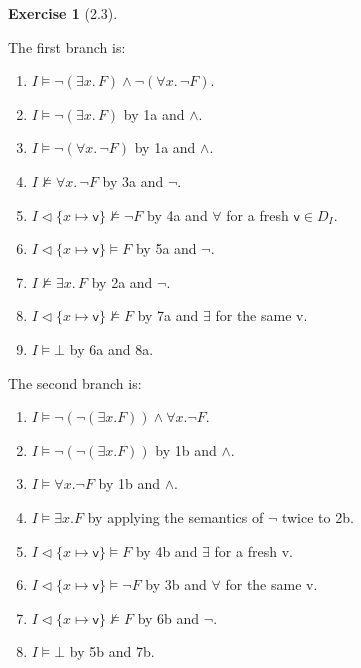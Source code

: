 \documentclass[12pt, psamsfonts]{amsart}
\theoremstyle{definition}
\newtheorem*{exer}{Exercise}
\theoremstyle{remark}
\numberwithin{equation}{subsection}
\begin{document}
\begin{exer}[2.3]
\begin{enumerate}[label=(\alph*)]
            The first branch is:
            \begin{enumerate}[label=\arabic*a.]
                \item %
                    $I \models \neg(\exists x.\, F) \land \neg(\forall x.\, \neg F)$.
                \item %
                    $I \models \neg(\exists x.\, F)$ by 1a and $\land$.
                \item %
                    $I \models \neg(\forall x.\, \neg F)$ by 1a and $\land$.
                \item %
                    $I \not\models \forall x.\, \neg F$ by 3a and $\neg$.
                \item %
                    $I \vartriangleleft \{ x \mapsto \textsf{v} \} \not\models \neg F$ by 4a and $\forall$ for a fresh $\textsf{v} \in D_I$.
                \item %
                    $I \vartriangleleft \{ x \mapsto \textsf{v} \} \models F$ by 5a and $\neg$.
                \item %
                    $I \not\models \exists x.\, F$ by 2a and $\neg$.
                \item %
                    $I \vartriangleleft \{ x \mapsto \textsf{v} \} \not\models F$ by 7a and $\exists$ for the same \textsf{v}.
                \item %
                    $I \models \bot$ by 6a and 8a.
            \end{enumerate}

            The second branch is:
            \begin{enumerate}[label=\arabic*b.]
                \item %
                    $I \models \neg(\neg(\exists x. F)) \land \forall x. \neg F$.
                \item %
                    $I \models \neg(\neg(\exists x. F))$ by 1b and $\land$.
                \item %
                    $I \models \forall x. \neg F$ by 1b and $\land$.
                \item %
                    $I \models \exists x. F$ by applying the semantics of $\neg$ twice to 2b.
                \item %
                    $I \vartriangleleft \{ x \mapsto \textsf{v} \} \models F$ by 4b and $\exists$ for a fresh \textsf{v}.
                \item %
                    $I \vartriangleleft \{ x \mapsto \textsf{v} \} \models \neg F$ by 3b and $\forall$ for the same \textsf{v}.
                \item %
                    $I \vartriangleleft \{ x \mapsto \textsf{v} \} \not\models F$ by 6b and $\neg$.
                \item %
                    $I \models \bot$ by 5b and 7b.
            \end{enumerate}

    \end{enumerate}
\end{exer}
\end{document}
